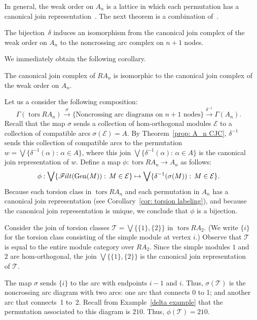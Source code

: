 \documentclass[ALCO,ThmDefs,Unicode,epreuves]{cedram}
\DeclareMathOperator{\tors}{tors}
\newcommand{\calE}{\mathcal{E}}
\newcommand{\calT}{\mathcal{T}}
\newcommand{\filt}{\mathscr{F}\Mk ilt}
\renewcommand{\Join}{\bigvee}
\newcommand{\Gen}{\operatorname{Gen}}
\renewcommand{\1}{\hat{1}}
\newcommand{\0}{\hat{0}}
\newcommand*{\Mk}{\mkern -2mu}
\begin{document}
In general, the weak order on $A_n$ is a lattice in which each permutation has a canonical join representation~\cite{weak_order}.
The next theorem is a combination of~\cite[Theorem~3.1 and
Corollary~3.4]{arcs}.

\begin{theorem}\label{prop: A_n CJC}
The bijection~$\delta$ induces an isomorphism from the canonical join complex of the weak order on $A_n$ to the noncrossing arc complex on $n+1$ nodes.
\end{theorem}

We immediately obtain the following corollary.
\begin{corollary}\label{cor: RA_n cjc}
The canonical join complex of $RA_n$ is isomorphic to the canonical join complex of the weak order on $A_n$.
\end{corollary}

Let us a consider the following composition:
\[
\Gamma(\tors RA_n) \xrightarrow{\sigma} \{\text{Noncrossing arc diagrams on $n+1$ nodes}\} \xrightarrow{\delta^{-1}} \Gamma(A_n).
\]
Recall that the map $\sigma$ sends a collection of hom-orthogonal modules $\calE$ to a collection of compatible arcs $\sigma(\calE)= A$.
By Theorem~\ref{prop: A_n CJC}, $\delta^{-1}$ sends this collection of compatible arcs to the permutation $w = \Join \{\delta^{-1}(\alpha):\, \alpha\in A\}$, where this join $\Join \{\delta^{-1}(\alpha):\, \alpha\in A\}$ is the canonical join representation of $w$.
Define a map ${\phi: \tors RA_n \to A_n}$ as follows:
\[\phi: \Join \{\filt(\Gen(M)):\, M\in \calE\} \mapsto \Join \{\delta^{-1}(\sigma(M)):\, M\in \calE\}.\]
Because each torsion class in $\tors RA_n$ and each permutation in $A_n$ has a canonical join representation (see Corollary~\ref{cor: torsion labeling}), and because the canonical join representation is unique, we conclude that $\phi$ is a bijection.


\begin{example}\label{phi example}
Consider the join of torsion classes $\calT = \Join \{\{1\}, \{2\}\}$ in $\tors RA_2$.
(We write $\{i\}$ for the torsion class consisting of the simple module at vertex $i$.)
Observe that $\calT$ is equal to the entire module category over $RA_2$.
Since the simple modules $1$ and $2$ are hom-orthogonal, the join $\Join \{\{1\}, \{2\}\} $ is the canonical join representation of $\calT$.

The map $\sigma$ sends $\{i\}$ to the arc with endpoints $i-1$ and $i$.
Thus, $\sigma(\calT)$ is the noncrossing arc diagram with two arcs: one arc that connects 0 to 1; and another arc that connects~1 to~2.
Recall from Example~\ref{delta example} that the permutation associated to this diagram is $210$.
Thus, $\phi(\calT)= 210$.
\end{example}
\end{document}

